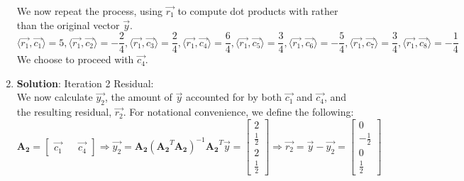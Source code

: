 \documentclass[11pt,letterpaper]{article}
\begin{document}
\begin{enumerate}
	    We now repeat the process, using $\vec{r_{1}}$ to compute dot products with rather than the original vector $\vec{y}$.
        \begin{equation*}
            \langle\vec{r_{1}},\vec{c_{1}}\rangle = 5,        \langle\vec{r_{1}},\vec{c_{2}}\rangle = -\frac{2}{4},
            \langle\vec{r_{1}},\vec{c_{3}}\rangle = \frac{2}{4},
            \langle\vec{r_{1}},\vec{c_{4}}\rangle = \frac{6}{4},
            \langle\vec{r_{1}},\vec{c_{5}}\rangle = \frac{3}{4},
            \langle\vec{r_{1}},\vec{c_{6}}\rangle = -\frac{5}{4},
            \langle\vec{r_{1}},\vec{c_{7}}\rangle = \frac{3}{4},
            \langle\vec{r_{1}},\vec{c_{8}}\rangle = -\frac{1}{4}
        \end{equation*}
        We choose to proceed with $\vec{c_{4}}$.
	\item \textbf{Solution}: Iteration 2 Residual: \\
	    We now calculate $\vec{y_{2}}$, the amount of $\vec{y}$ accounted for by both $\vec{c_{1}}$ and $\vec{c_{4}}$, and the resulting residual, $\vec{r_{2}}$. For notational convenience, we define the following:
        \begin{equation*}
            \boldsymbol{A_{2}} = \begin{bmatrix}
                \vec{c_{1}} && \vec{c_{4}}
            \end{bmatrix} \Rightarrow
            \vec{y_{2}} = \boldsymbol{A_{2}}(\boldsymbol{A_{2}}^T\boldsymbol{A_{2}})^{-1}\boldsymbol{A_{2}}^T\vec{y} = \begin{bmatrix}
                2 \\ \frac{1}{2} \\ 2 \\ \frac{1}{2}
            \end{bmatrix} \Rightarrow
            \vec{r_{2}} = \vec{y} - \vec{y_{2}} = \begin{bmatrix}
                0 \\ -\frac{1}{2} \\ 0 \\ \frac{1}{2}
            \end{bmatrix} 
        \end{equation*}
	    
\end{enumerate} 
\end{document}
